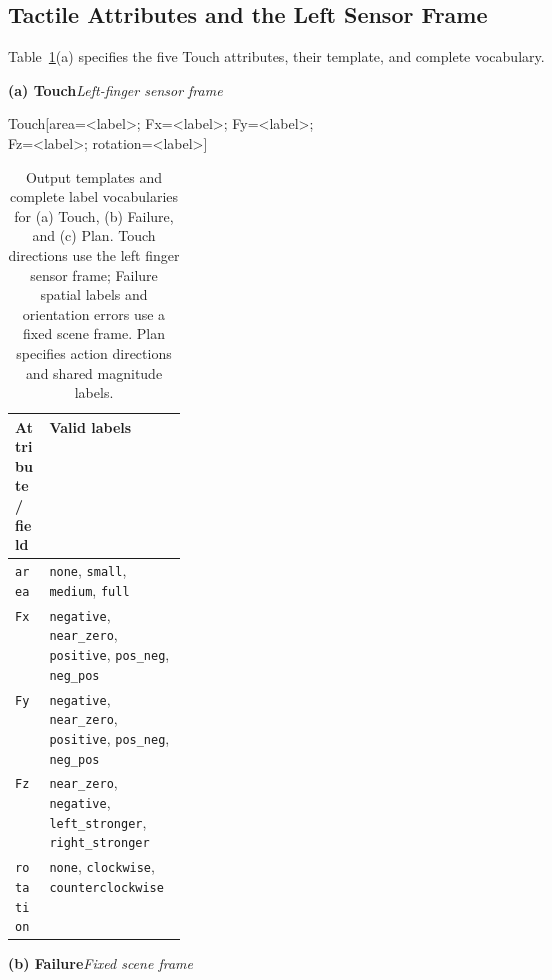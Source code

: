 \subsection{Tactile Attributes and the Left Sensor Frame}
\label{sec:app_touch}

Table~\ref{tab:app_semantic_interfaces}(a) specifies the five Touch attributes, their template, and complete vocabulary.

\begin{table}[t]
\centering
\small
\caption{Output templates and complete label vocabularies for (a) Touch, (b) Failure, and (c) Plan. Touch directions use the left finger sensor frame; Failure spatial labels and orientation errors use a fixed scene frame. Plan specifies action directions and shared magnitude labels.}
\label{tab:app_semantic_interfaces}
\begin{minipage}{\textwidth}
\textbf{(a) Touch}\hfill\textit{Left-finger sensor frame}
\vspace{4pt}

{\footnotesize\ttfamily\raggedright
Touch[area=<label>; Fx=<label>; Fy=<label>;\\
\hspace*{3em}Fz=<label>; rotation=<label>]\par}
\vspace{5pt}
\setlength{\tabcolsep}{5pt}
\renewcommand{\arraystretch}{1.15}
\begin{tabularx}{\linewidth}{@{}p{0.20\linewidth}>{\raggedright\arraybackslash}X@{}}
\toprule
\textbf{Attribute / field} & \textbf{Valid labels} \\
\midrule
\texttt{area} & \texttt{none}, \texttt{small}, \texttt{medium}, \texttt{full} \\
\texttt{Fx} & \texttt{negative}, \texttt{near\_zero}, \texttt{positive}, \texttt{pos\_neg}, \texttt{neg\_pos} \\
\texttt{Fy} & \texttt{negative}, \texttt{near\_zero}, \texttt{positive}, \texttt{pos\_neg}, \texttt{neg\_pos} \\
\texttt{Fz} & \texttt{near\_zero}, \texttt{negative}, \texttt{left\_stronger}, \texttt{right\_stronger} \\
\texttt{rotation} & \texttt{none}, \texttt{clockwise}, \texttt{counterclockwise} \\
\bottomrule
\end{tabularx}
\end{minipage}
\par\vspace{8pt}
\begin{minipage}{\textwidth}
\textbf{(b) Failure}\hfill\textit{Fixed scene frame}
\vspace{4pt}


\end{minipage}
\end{table}
